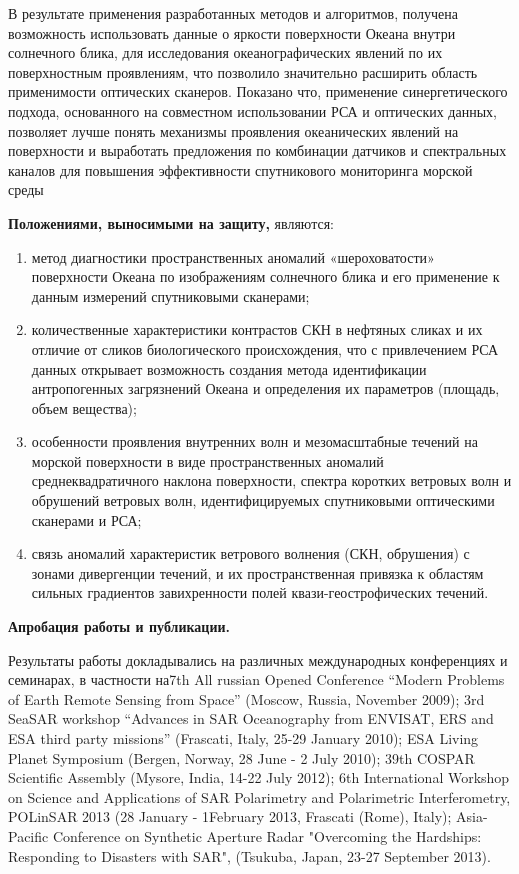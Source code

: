 В результате применения разработанных методов и алгоритмов, получена возможность использовать данные о яркости поверхности Океана внутри солнечного блика, для исследования океанографических явлений по их поверхностным проявлениям, что позволило значительно расширить область применимости оптических сканеров. Показано что, применение синергетического подхода, основанного на совместном использовании РСА и оптических данных, позволяет лучше понять механизмы проявления океанических явлений на поверхности и выработать предложения по комбинации датчиков и спектральных каналов для повышения эффективности спутникового мониторинга морской среды 

\textbf{Положениями, выносимыми на защиту,} являются:

\begin{enumerate}
\item  метод диагностики пространственных аномалий «шероховатости» поверхности Океана по изображениям солнечного блика и его применение к данным измерений спутниковыми сканерами;

\item  количественные характеристики контрастов СКН в нефтяных сликах и их отличие от сликов биологического происхождения, что с привлечением РСА данных открывает возможность создания метода идентификации антропогенных загрязнений Океана и определения их параметров (площадь, объем вещества);

\item  особенности проявления внутренних волн и мезомасштабные течений на морской поверхности в виде пространственных аномалий среднеквадратичного наклона поверхности, спектра коротких ветровых волн и обрушений ветровых волн, идентифицируемых спутниковыми оптическими сканерами и РСА; 

\item  связь аномалий характеристик ветрового волнения (СКН, обрушения) с зонами дивергенции течений, и их пространственная привязка к областям сильных градиентов завихренности полей квази-геострофических течений.
\end{enumerate}

\textbf{Апробация работы и публикации.}

Результаты работы докладывались на различных международных конференциях и семинарах, в частности на7th All russian Opened Conference ``Modern Problems of Earth Remote Sensing from Space'' (Moscow, Russia, November 2009); 3rd SeaSAR workshop ``Advances in SAR Oceanography from ENVISAT, ERS and ESA third party missions'' (Frascati, Italy, 25-29 January 2010); ESA Living Planet Symposium (Bergen, Norway, 28 June - 2 July 2010); 39th COSPAR Scientific Assembly (Mysore, India, 14-22 July 2012); 6th International Workshop on Science and Applications of SAR Polarimetry and Polarimetric Interferometry, POLinSAR 2013 (28 January - 1February 2013, Frascati (Rome), Italy); Asia-Pacific Conference on Synthetic Aperture Radar "Overcoming the Hardships: Responding to Disasters with SAR", (Tsukuba, Japan, 23-27 September 2013).

